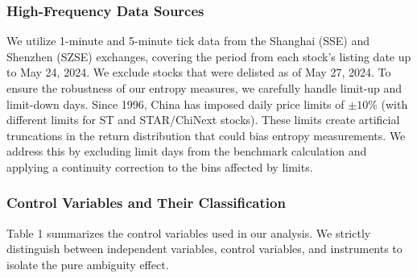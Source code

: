 \documentclass[preprint,12pt,authoryear]{elsarticle}
\begin{document}
\subsubsection{High-Frequency Data Sources}

We utilize 1-minute and 5-minute tick data from the Shanghai (SSE) and Shenzhen (SZSE) exchanges, covering the period from each stock's listing date up to May 24, 2024. We exclude stocks that were delisted as of May 27, 2024. To ensure the robustness of our entropy measures, we carefully handle limit-up and limit-down days. Since 1996, China has imposed daily price limits of $\pm 10\%$ (with different limits for ST and STAR/ChiNext stocks). These limits create artificial truncations in the return distribution that could bias entropy measurements. We address this by excluding limit days from the benchmark calculation and applying a continuity correction to the bins affected by limits.

\subsubsection{Control Variables and Their Classification}

Table 1 summarizes the control variables used in our analysis. We strictly distinguish between independent variables, control variables, and instruments to isolate the pure ambiguity effect.
\end{document}
